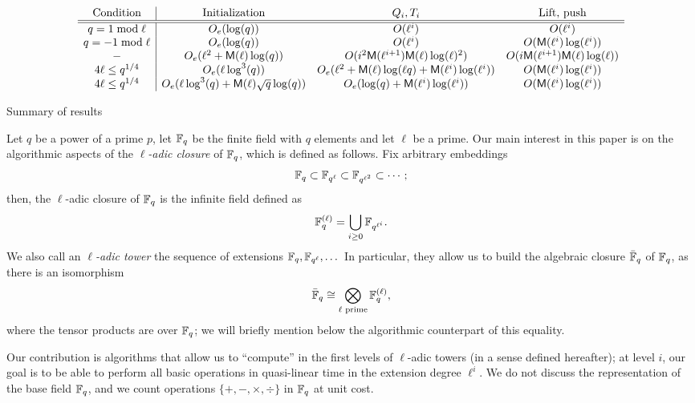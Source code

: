 \documentclass{sig-alternate}
\begin{document}
\begin{table*}[!t]
$$
\begin{array}{c|cccc}
  \text{Condition} & \text{Initialization} & Q_i, T_i & \text{Lift, push}\\
  \hline \hline
  q = 1 \bmod \ell & O_e(\log(q))  & O(\ell^i) & O(\ell^i) \\
  q = -1 \bmod \ell & O_e(\log(q)) & O(\ell^i) & O(\mathsf{M}(\ell^i) \log(\ell^i)) \\
  - & O_e (\ell^2+\mathsf{M}(\ell) \log(q)) & O(i^2\mathsf{M}(\ell^{i+1})\mathsf{M}(\ell)\log(\ell)^2) & O(i \mathsf{M}(\ell^{i+1})\mathsf{M}(\ell)\log(\ell))\\
  4\ell \le q^{1/4} & O_e(\ell\log^3(q))  & O_e(\ell^2+\mathsf{M}(\ell)\log(\ell
  q)+\mathsf{M}(\ell^i)\log(\ell^i)) & O(\mathsf{M}(\ell^i) \log(\ell^i)) \\
  4\ell \le q^{1/4} & O_e(\ell\log^3(q) + \mathsf{M}(\ell)\sqrt{q}\log(q)) & O_e(\log(q) + \mathsf{M}(\ell^i) \log(\ell^i)) & O(\mathsf{M}(\ell^i) \log(\ell^i)) 
\end{array}
$$
\label{table:main}
\caption{Summary of results}
\end{table*}

Let $q$ be a power of a prime $p$, let $\mathbb{F}_q$ be the finite field with
$q$ elements and let $\ell$ be a prime. Our main interest in this
paper is on the algorithmic aspects of the \emph{$\ell$-adic closure}
of $\mathbb{F}_q$, which is defined as follows. Fix arbitrary embeddings
\begin{equation*}
  \mathbb{F}_q \subset \mathbb{F}_{q^\ell} \subset \mathbb{F}_{q^{\ell^2}} \subset \cdots;
\end{equation*}
then, the $\ell$-adic closure of $\mathbb{F}_q$ is the infinite field defined as
\begin{equation*}
  \mathbb{F}_q^{(\ell)} = \bigcup_{i\ge 0}\mathbb{F}_{q^{\ell^i}}.
\end{equation*}
We also call an \emph{$\ell$-adic tower} the sequence of extensions
$\mathbb{F}_q,\mathbb{F}_{q^\ell},\dots$ In particular, they allow us to build the
algebraic closure $\bar{\mathbb{F}}_q$ of $\mathbb{F}_q$, as there is an isomorphism
\begin{equation}
  \label{eq:tensor}
  \bar{\mathbb{F}}_q \cong \bigotimes_{\ell\text{ prime}} \mathbb{F}_q^{(\ell)},
\end{equation}
where the tensor products are over $\mathbb{F}_q$; we will briefly mention
below the algorithmic counterpart of this equality.

Our contribution is algorithms that allow us to ``compute'' in the
first levels of $\ell$-adic towers (in a sense defined hereafter); at
level $i$, our goal is to be able to perform all basic operations in
quasi-linear time in the extension degree $\ell^i$.  We do not discuss
the representation of the base field $\mathbb{F}_q$, and we count 
operations $\{+,-,\times,\div\}$ in $\mathbb{F}_q$ at unit cost.
\end{document}

